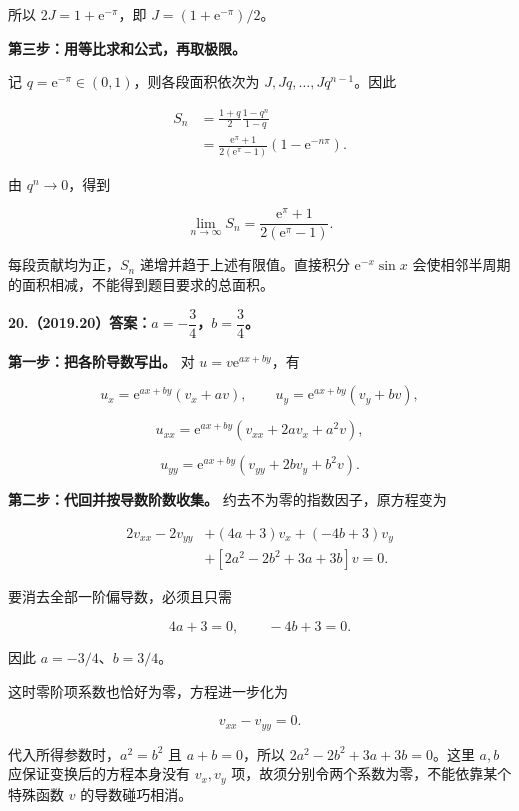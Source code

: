 \documentclass[UTF8,11pt,fontset=windows]{ctexart}
\begin{document}
所以 $2J=1+\mathrm e^{-\pi}$，即 $J=(1+\mathrm e^{-\pi})/2$。

\textbf{第三步：用等比求和公式，再取极限。}

记 $q=\mathrm e^{-\pi}\in(0,1)$，则各段面积依次为 $J,Jq,\ldots,Jq^{n-1}$。因此

$$
\begin{aligned}
S_n&=\frac{1+q}{2}\frac{1-q^n}{1-q}\\
&=\boxed{\frac{\mathrm e^\pi+1}{2(\mathrm e^\pi-1)}(1-\mathrm e^{-n\pi})}.
\end{aligned}
$$

由 $q^n\to0$，得到

$$
\boxed{\lim_{n\to\infty}S_n
=\frac{\mathrm e^\pi+1}{2(\mathrm e^\pi-1)}.}
$$

每段贡献均为正，$S_n$ 递增并趋于上述有限值。直接积分 $\mathrm e^{-x}\sin x$ 会使相邻半周期的面积相减，不能得到题目要求的总面积。

\clearpage

\textbf{20.（2019.20）答案：$a=-\dfrac34$，$b=\dfrac34$。}

\textbf{第一步：把各阶导数写出。} 对 $u=v\mathrm e^{ax+by}$，有

$$
u_x=\mathrm e^{ax+by}(v_x+av),
\qquad
u_y=\mathrm e^{ax+by}(v_y+bv),
$$

$$
u_{xx}=\mathrm e^{ax+by}(v_{xx}+2av_x+a^2v),
$$

$$
u_{yy}=\mathrm e^{ax+by}(v_{yy}+2bv_y+b^2v).
$$

\textbf{第二步：代回并按导数阶数收集。} 约去不为零的指数因子，原方程变为

$$
\begin{aligned}
2v_{xx}-2v_{yy}
&+(4a+3)v_x+(-4b+3)v_y\\
&+[2a^2-2b^2+3a+3b]v=0.
\end{aligned}
$$

要消去全部一阶偏导数，必须且只需

$$
4a+3=0,\qquad -4b+3=0.
$$

因此 $a=-3/4$、$b=3/4$。

这时零阶项系数也恰好为零，方程进一步化为

$$
v_{xx}-v_{yy}=0.
$$

代入所得参数时，$a^2=b^2$ 且 $a+b=0$，所以 $2a^2-2b^2+3a+3b=0$。这里 $a,b$ 应保证变换后的方程本身没有 $v_x,v_y$ 项，故须分别令两个系数为零，不能依靠某个特殊函数 $v$ 的导数碰巧相消。

\clearpage
\end{document}
